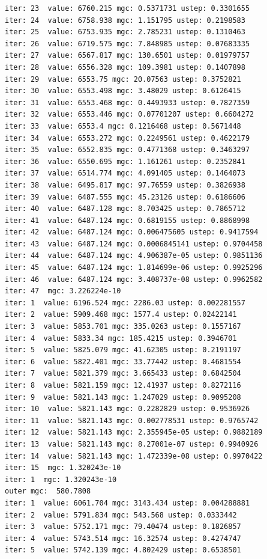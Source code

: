 \documentclass[
  letterpaper,
  DIV=11,
  numbers=noendperiod]{scrartcl}
\begin{document}
\begin{verbatim}
iter: 23  value: 6760.215 mgc: 0.5371731 ustep: 0.3301655 
iter: 24  value: 6758.938 mgc: 1.151795 ustep: 0.2198583 
iter: 25  value: 6753.935 mgc: 2.785231 ustep: 0.1310463 
iter: 26  value: 6719.575 mgc: 7.848985 ustep: 0.07683335 
iter: 27  value: 6567.817 mgc: 130.6501 ustep: 0.01979757 
iter: 28  value: 6556.328 mgc: 109.3981 ustep: 0.1407898 
iter: 29  value: 6553.75 mgc: 20.07563 ustep: 0.3752821 
iter: 30  value: 6553.498 mgc: 3.48029 ustep: 0.6126415 
iter: 31  value: 6553.468 mgc: 0.4493933 ustep: 0.7827359 
iter: 32  value: 6553.446 mgc: 0.07701207 ustep: 0.6604272 
iter: 33  value: 6553.4 mgc: 0.1216468 ustep: 0.5671448 
iter: 34  value: 6553.272 mgc: 0.2249561 ustep: 0.4622179 
iter: 35  value: 6552.835 mgc: 0.4771368 ustep: 0.3463297 
iter: 36  value: 6550.695 mgc: 1.161261 ustep: 0.2352841 
iter: 37  value: 6514.774 mgc: 4.091405 ustep: 0.1464073 
iter: 38  value: 6495.817 mgc: 97.76559 ustep: 0.3826938 
iter: 39  value: 6487.555 mgc: 45.23126 ustep: 0.6186606 
iter: 40  value: 6487.128 mgc: 8.703425 ustep: 0.7865712 
iter: 41  value: 6487.124 mgc: 0.6819155 ustep: 0.8868998 
iter: 42  value: 6487.124 mgc: 0.006475605 ustep: 0.9417594 
iter: 43  value: 6487.124 mgc: 0.0006845141 ustep: 0.9704458 
iter: 44  value: 6487.124 mgc: 4.906387e-05 ustep: 0.9851136 
iter: 45  value: 6487.124 mgc: 1.814699e-06 ustep: 0.9925296 
iter: 46  value: 6487.124 mgc: 3.408737e-08 ustep: 0.9962582 
iter: 47  mgc: 3.226224e-10 
iter: 1  value: 6196.524 mgc: 2286.03 ustep: 0.002281557 
iter: 2  value: 5909.468 mgc: 1577.4 ustep: 0.02422141 
iter: 3  value: 5853.701 mgc: 335.0263 ustep: 0.1557167 
iter: 4  value: 5833.34 mgc: 185.4215 ustep: 0.3946701 
iter: 5  value: 5825.079 mgc: 41.62305 ustep: 0.2191197 
iter: 6  value: 5822.401 mgc: 33.77442 ustep: 0.4681554 
iter: 7  value: 5821.379 mgc: 3.665433 ustep: 0.6842504 
iter: 8  value: 5821.159 mgc: 12.41937 ustep: 0.8272116 
iter: 9  value: 5821.143 mgc: 1.247029 ustep: 0.9095208 
iter: 10  value: 5821.143 mgc: 0.2282829 ustep: 0.9536926 
iter: 11  value: 5821.143 mgc: 0.002778531 ustep: 0.9765742 
iter: 12  value: 5821.143 mgc: 2.355945e-05 ustep: 0.9882189 
iter: 13  value: 5821.143 mgc: 8.27001e-07 ustep: 0.9940926 
iter: 14  value: 5821.143 mgc: 1.472339e-08 ustep: 0.9970422 
iter: 15  mgc: 1.320243e-10 
iter: 1  mgc: 1.320243e-10 
outer mgc:  580.7808 
iter: 1  value: 6061.704 mgc: 3143.434 ustep: 0.004288881 
iter: 2  value: 5791.834 mgc: 543.568 ustep: 0.0333442 
iter: 3  value: 5752.171 mgc: 79.40474 ustep: 0.1826857 
iter: 4  value: 5743.514 mgc: 16.32574 ustep: 0.4274747 
iter: 5  value: 5742.139 mgc: 4.802429 ustep: 0.6538501 

\end{verbatim}
\end{document}
